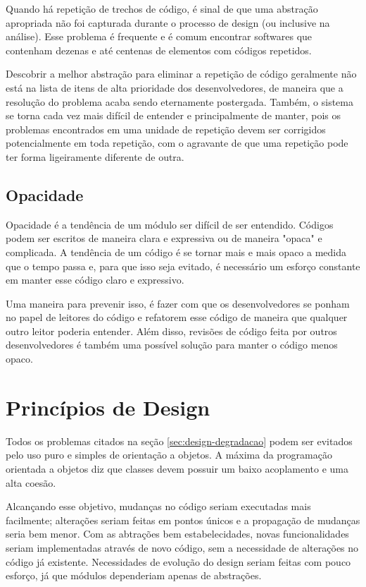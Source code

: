 Quando há repetição de trechos de código, é sinal de que uma abstração
apropriada não foi capturada durante o processo de design (ou inclusive na
análise). Esse problema é frequente e é comum encontrar softwares que contenham 
dezenas e até centenas de elementos com códigos repetidos. 

Descobrir a melhor abstração para eliminar a repetição de código geralmente não 
está na lista de itens de alta prioridade dos desenvolvedores, de maneira que a 
resolução do problema acaba sendo eternamente postergada. Também, o sistema se
torna cada vez mais difícil de entender e principalmente de manter, pois os 
problemas encontrados em uma unidade de repetição devem ser corrigidos
potencialmente  em toda repetição, com o agravante de que uma repetição pode
ter forma ligeiramente diferente de outra.

\subsection{Opacidade}

Opacidade é a tendência de um módulo ser difícil de ser entendido. Códigos podem
ser escritos de maneira clara e expressiva ou de maneira "opaca" e complicada. A
tendência de um código é se tornar mais e mais opaco a medida que o tempo passa
e, para que isso seja evitado, é necessário um esforço constante em manter esse 
código claro e expressivo. 

Uma maneira para prevenir isso, é fazer com que os desenvolvedores se ponham no
papel de leitores do código e refatorem esse código de maneira que qualquer
outro  leitor poderia entender. Além disso, revisões de código feita por outros
desenvolvedores é também uma possível solução para manter o código menos opaco.

\section{Princípios de Design}
\label{sec:design-oo-principios}

Todos os problemas citados na seção \ref{sec:design-degradacao} podem ser
evitados pelo uso puro e simples de orientação a objetos. A máxima da
programação orientada a objetos diz que classes devem possuir um baixo
acoplamento e uma alta coesão.

Alcançando esse objetivo, mudanças no código seriam executadas mais facilmente;
alterações seriam feitas em pontos únicos e a propagação de mudanças seria bem
menor. Com as abtrações bem estabelecidades, novas funcionalidades seriam
implementadas através de novo código, sem a necessidade de alterações no código
já existente. Necessidades de evolução do design seriam feitas com pouco
esforço, já que módulos dependeriam apenas de abstrações.

